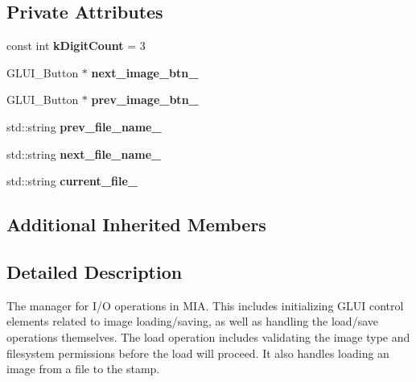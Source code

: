 \subsection*{Private Attributes}
\begin{DoxyCompactItemize}
\item 
const int {\bfseries k\+Digit\+Count} = 3\hypertarget{classimage__tools_1_1MIAIOManager_ae23ff91257f13ceb716b3f6b42d1decc}{}\label{classimage__tools_1_1MIAIOManager_ae23ff91257f13ceb716b3f6b42d1decc}

\item 
G\+L\+U\+I\+\_\+\+Button $\ast$ {\bfseries next\+\_\+image\+\_\+btn\+\_\+}\hypertarget{classimage__tools_1_1MIAIOManager_ac460a985e354d6723c9994f67a242e58}{}\label{classimage__tools_1_1MIAIOManager_ac460a985e354d6723c9994f67a242e58}

\item 
G\+L\+U\+I\+\_\+\+Button $\ast$ {\bfseries prev\+\_\+image\+\_\+btn\+\_\+}\hypertarget{classimage__tools_1_1MIAIOManager_a5a5240d979e795fb3525a3c2b71dd162}{}\label{classimage__tools_1_1MIAIOManager_a5a5240d979e795fb3525a3c2b71dd162}

\item 
std\+::string {\bfseries prev\+\_\+file\+\_\+name\+\_\+}\hypertarget{classimage__tools_1_1MIAIOManager_a19135385f2e4f3b2cc1df586738672e8}{}\label{classimage__tools_1_1MIAIOManager_a19135385f2e4f3b2cc1df586738672e8}

\item 
std\+::string {\bfseries next\+\_\+file\+\_\+name\+\_\+}\hypertarget{classimage__tools_1_1MIAIOManager_a5d047c8bdf266f5e6f1b99b744f2bc9d}{}\label{classimage__tools_1_1MIAIOManager_a5d047c8bdf266f5e6f1b99b744f2bc9d}

\item 
std\+::string {\bfseries current\+\_\+file\+\_\+}\hypertarget{classimage__tools_1_1MIAIOManager_a4180b729e1a48281ccbae79d6f69e5c0}{}\label{classimage__tools_1_1MIAIOManager_a4180b729e1a48281ccbae79d6f69e5c0}

\end{DoxyCompactItemize}
\subsection*{Additional Inherited Members}


\subsection{Detailed Description}
The manager for I/O operations in M\+IA. This includes initializing G\+L\+UI control elements related to image loading/saving, as well as handling the load/save operations themselves. The load operation includes validating the image type and filesystem permissions before the load will proceed. It also handles loading an image from a file to the stamp. 

